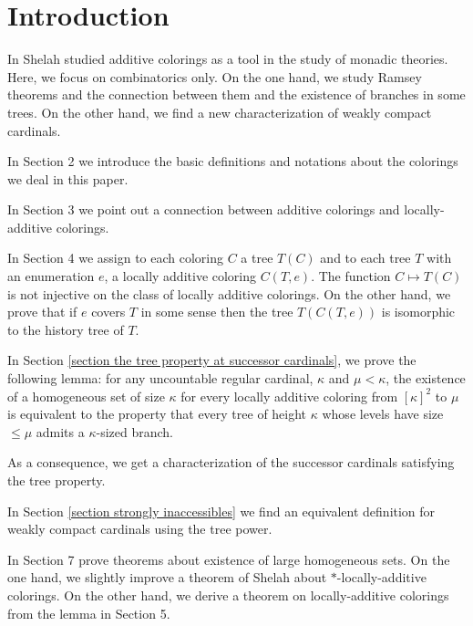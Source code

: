 \documentclass[11pt]{amsart}
\theoremstyle{plain}
\theoremstyle{definition} %
\theoremstyle{remark}
\begin{document}
\section{Introduction}

In \cite{sh42} Shelah studied additive colorings as a tool in the study of monadic theories. Here, we focus on combinatorics only. On the one hand, we study Ramsey theorems and the connection between them and the existence of branches in some trees. On the other hand, we find a new characterization of weakly compact cardinals.



In Section 2 we introduce the basic definitions and notations about the colorings we deal in this paper.

In Section 3 we point out a connection between additive colorings and locally-additive colorings.

In Section 4 we assign to each coloring $C$ a tree $T(C)$ and to each tree $T$ with an enumeration $e$, a locally additive coloring $C(T,e)$. The function $C \mapsto T(C)$ is not injective on the class of locally additive colorings. On the other hand, we prove that if $e$ covers $T$ in some sense then
the tree $T(C(T,e))$ is isomorphic to the history tree of $T$.

In Section \ref{section the tree property at successor cardinals}, we prove the following lemma:
for any uncountable regular cardinal, $\kappa$ and $\mu<\kappa$,
the existence of a homogeneous set of size $\kappa$ for every locally additive coloring from $[\kappa]^2$ to $\mu$ is equivalent to the property that every tree of height $\kappa$ whose levels have size $\leq \mu$ admits a $\kappa$-sized branch.

As a consequence, we get a characterization of the successor cardinals satisfying the tree property.

In Section \ref{section strongly inaccessibles} we find an equivalent definition for weakly compact cardinals using the tree power.

In Section 7 prove theorems about existence of large homogeneous sets. On the one hand, we slightly improve a theorem of Shelah about $*$-locally-additive colorings. On the other hand, we derive a theorem on locally-additive colorings from the lemma in Section 5.
\end{document}
